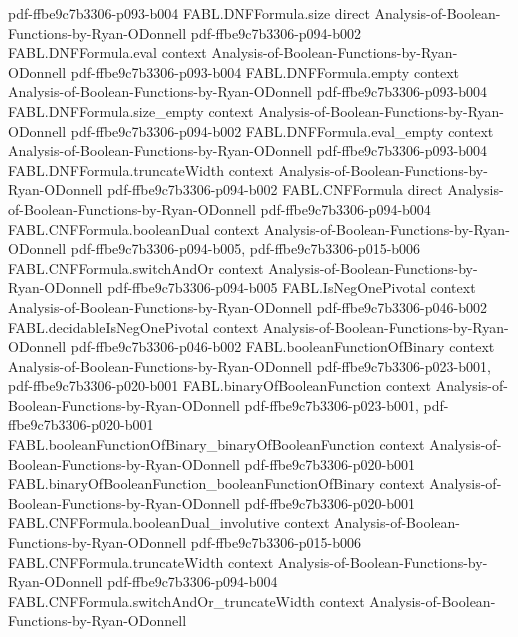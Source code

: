\begin{theorem}
  {pdf-ffbe9c7b3306-p093-b004}
\proofstep
  {FABL.DNFFormula.size}
  {direct}
  {Analysis-of-Boolean-Functions-by-Ryan-ODonnell}
  {pdf-ffbe9c7b3306-p094-b002}
\proofstep
  {FABL.DNFFormula.eval}
  {context}
  {Analysis-of-Boolean-Functions-by-Ryan-ODonnell}
  {pdf-ffbe9c7b3306-p093-b004}
\proofstep
  {FABL.DNFFormula.empty}
  {context}
  {Analysis-of-Boolean-Functions-by-Ryan-ODonnell}
  {pdf-ffbe9c7b3306-p093-b004}
\proofstep
  {FABL.DNFFormula.size_empty}
  {context}
  {Analysis-of-Boolean-Functions-by-Ryan-ODonnell}
  {pdf-ffbe9c7b3306-p094-b002}
\proofstep
  {FABL.DNFFormula.eval_empty}
  {context}
  {Analysis-of-Boolean-Functions-by-Ryan-ODonnell}
  {pdf-ffbe9c7b3306-p093-b004}
\proofstep
  {FABL.DNFFormula.truncateWidth}
  {context}
  {Analysis-of-Boolean-Functions-by-Ryan-ODonnell}
  {pdf-ffbe9c7b3306-p094-b002}
\proofstep
  {FABL.CNFFormula}
  {direct}
  {Analysis-of-Boolean-Functions-by-Ryan-ODonnell}
  {pdf-ffbe9c7b3306-p094-b004}
\proofstep
  {FABL.CNFFormula.booleanDual}
  {context}
  {Analysis-of-Boolean-Functions-by-Ryan-ODonnell}
  {pdf-ffbe9c7b3306-p094-b005,
    pdf-ffbe9c7b3306-p015-b006}
\proofstep
  {FABL.CNFFormula.switchAndOr}
  {context}
  {Analysis-of-Boolean-Functions-by-Ryan-ODonnell}
  {pdf-ffbe9c7b3306-p094-b005}
\proofstep
  {FABL.IsNegOnePivotal}
  {context}
  {Analysis-of-Boolean-Functions-by-Ryan-ODonnell}
  {pdf-ffbe9c7b3306-p046-b002}
\proofstep
  {FABL.decidableIsNegOnePivotal}
  {context}
  {Analysis-of-Boolean-Functions-by-Ryan-ODonnell}
  {pdf-ffbe9c7b3306-p046-b002}
\proofstep
  {FABL.booleanFunctionOfBinary}
  {context}
  {Analysis-of-Boolean-Functions-by-Ryan-ODonnell}
  {pdf-ffbe9c7b3306-p023-b001,
    pdf-ffbe9c7b3306-p020-b001}
\proofstep
  {FABL.binaryOfBooleanFunction}
  {context}
  {Analysis-of-Boolean-Functions-by-Ryan-ODonnell}
  {pdf-ffbe9c7b3306-p023-b001,
    pdf-ffbe9c7b3306-p020-b001}
\proofstep
  {FABL.booleanFunctionOfBinary_binaryOfBooleanFunction}
  {context}
  {Analysis-of-Boolean-Functions-by-Ryan-ODonnell}
  {pdf-ffbe9c7b3306-p020-b001}
\proofstep
  {FABL.binaryOfBooleanFunction_booleanFunctionOfBinary}
  {context}
  {Analysis-of-Boolean-Functions-by-Ryan-ODonnell}
  {pdf-ffbe9c7b3306-p020-b001}
\proofstep
  {FABL.CNFFormula.booleanDual_involutive}
  {context}
  {Analysis-of-Boolean-Functions-by-Ryan-ODonnell}
  {pdf-ffbe9c7b3306-p015-b006}
\proofstep
  {FABL.CNFFormula.truncateWidth}
  {context}
  {Analysis-of-Boolean-Functions-by-Ryan-ODonnell}
  {pdf-ffbe9c7b3306-p094-b004}
\proofstep
  {FABL.CNFFormula.switchAndOr_truncateWidth}
  {context}
  {Analysis-of-Boolean-Functions-by-Ryan-ODonnell}

\end{theorem}
